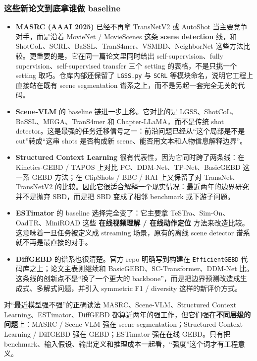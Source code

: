 \documentclass[a4paper]{article}
\begin{document}
\subsubsection{这些新论文到底拿谁做 baseline}

\begin{itemize}
\item \textbf{MASRC (AAAI 2025)} 已经不再拿 TransNetV2 或 AutoShot 当主要竞争对手，而是沿着 MovieNet / MovieScenes 这条 \textbf{scene detection} 线，和 ShotCoL、SCRL、BaSSL、TranS4mer、VSMBD、NeighborNet 这些方法比较。更重要的是，它在同一篇论文里同时给出 self-supervision、fully supervision、self-supervised transfer 三个 setting 的表格，不是只挑一个 setting 取巧。仓库内部还保留了 \texttt{LGSS.py} 与 \texttt{SCRL} 等模块命名，说明它工程上直接站在既有 scene segmentation 谱系之上，而不是另起一套完全无关的代码。
\item \textbf{Scene-VLM} 的 baseline 链进一步上移。它对比的是 LGSS、ShotCoL、BaSSL、MEGA、TranS4mer 和 Chapter-LLaMA，而不是传统 shot detector。这是最强的任务迁移信号之一：前沿问题已经从“这个局部是不是 cut”转成“这串 shots 是否构成新 scene、能否用文本和人物信息解释边界”。
\item \textbf{Structured Context Learning} 很有代表性，因为它同时跨了两条线：在 Kinetics-GEBD / TAPOS 上对比 PC、DDM-Net、TP-Net、BasicGEBD 这一系 GEBD 方法；在 ClipShots / BBC / RAI 上又保留了对 TransNet、TransNetV2 的比较。因此它很适合解释一个现实情况：最近两年的边界研究并不是抛弃 SBD，而是把 SBD 变成了相邻 benchmark 或下游子问题。
\item \textbf{ESTimator} 的 baseline 选择完全变了：它主要拿 TeSTra、Sim-On、OadTR、MiniROAD 这些 \textbf{在线视频理解 / 在线动作定位} 方法来改造比较。这意味着一旦任务被定义成 streaming 场景，原有的离线 scene detector 谱系就不再是最直接的对手。
\item \textbf{DiffGEBD} 的谱系也很清楚。官方 repo 明确写到构建在 \texttt{EfficientGEBD} 代码库之上；论文主表则继续和 BasicGEBD、SC-Transformer、DDM-Net 比。这条线的创新点不是“换了一个更大的 backbone”，而是把边界预测改造成生成式、多解式问题，并引入 symmetric F1 / diversity 这样的新评价方式。
\end{itemize}

\begin{evidencebox}{对“最近模型强不强”的正确读法}
MASRC、Scene-VLM、Structured Context Learning、ESTimator、DiffGEBD 都算近两年的强工作，但它们强在\textbf{不同层级的问题}上：MASRC / Scene-VLM 强在 scene segmentation；Structured Context Learning / DiffGEBD 强在 GEBD；ESTimator 强在在线 GEBD。只有把 benchmark、输入假设、输出定义和推理成本一起看，“强度”这个词才有工程意义。
\end{evidencebox}
\end{document}
